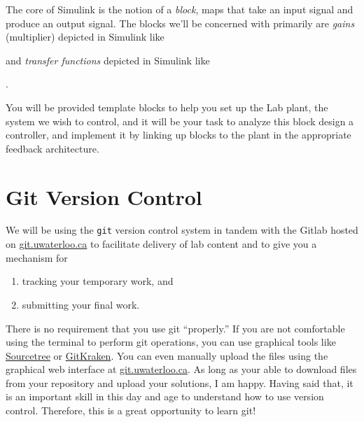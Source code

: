\documentclass[letterpaper, 12pt, oneside]{memoir}
\begin{document}
The core of Simulink is the notion of a \emph{block}, maps that take an input
signal and produce an output signal.
The blocks we'll be concerned with primarily are \emph{gains}
(multiplier) depicted in Simulink like
\begin{center}
\end{center}
and \emph{transfer functions} depicted in Simulink like
\begin{center}
  .
\end{center}
You will be provided template blocks to help you set up the Lab plant, the
system we wish to control, and it will be your task to analyze this block
design a controller, and implement it by linking up blocks to the plant
in the appropriate feedback architecture.

\section{Git Version Control}
We will be using the \texttt{git} version control system in tandem with
the Gitlab hosted on \url{git.uwaterloo.ca} to facilitate delivery of lab
content and to give you a mechanism for
\begin{enumerate}[label=(\arabic*)]
  \item{tracking your temporary work, and}
  \item{submitting your final work.}
\end{enumerate}
There is no requirement that you use git ``properly.'' If you are not
comfortable using the terminal to perform git operations, you can use graphical
tools like \href{https://www.sourcetreeapp.com/}{Sourcetree} or
\href{https://www.gitkraken.com/git-client}{GitKraken}. You can even manually
upload the files using the graphical web interface at \url{git.uwaterloo.ca}.
As long as your able to download files from your repository and upload your
solutions, I am happy. Having said that, it is an important skill in this
day and age to understand how to use version control. Therefore, this is a
great opportunity to learn git!
\end{document}
